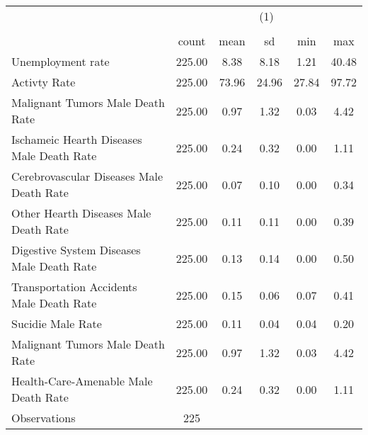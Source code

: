 {
\def\sym#1{\ifmmode^{#1}\else\(^{#1}\)\fi}
\begin{tabular}{l*{1}{ccccc}}
\hline\hline
                    &\multicolumn{5}{c}{(1)}                                                  \\
                    &\multicolumn{5}{c}{}                                                     \\
                    &       count         &        mean&          sd&         min&         max\\
\hline
Unemployment rate   &      225.00         &        8.38&        8.18&        1.21&       40.48\\
Activty Rate        &      225.00         &       73.96&       24.96&       27.84&       97.72\\
Malignant Tumors Male Death Rate&      225.00         &        0.97&        1.32&        0.03&        4.42\\
Ischameic Hearth Diseases Male Death Rate&      225.00         &        0.24&        0.32&        0.00&        1.11\\
Cerebrovascular Diseases Male Death Rate&      225.00         &        0.07&        0.10&        0.00&        0.34\\
Other Hearth Diseases Male Death Rate&      225.00         &        0.11&        0.11&        0.00&        0.39\\
Digestive System Diseases Male Death Rate&      225.00         &        0.13&        0.14&        0.00&        0.50\\
Transportation Accidents Male Death Rate&      225.00         &        0.15&        0.06&        0.07&        0.41\\
Sucidie Male Rate   &      225.00         &        0.11&        0.04&        0.04&        0.20\\
Malignant Tumors Male Death Rate&      225.00         &        0.97&        1.32&        0.03&        4.42\\
Health-Care-Amenable Male Death Rate&      225.00         &        0.24&        0.32&        0.00&        1.11\\
\hline
Observations        &         225         &            &            &            &            \\
\hline\hline
\end{tabular}
}
